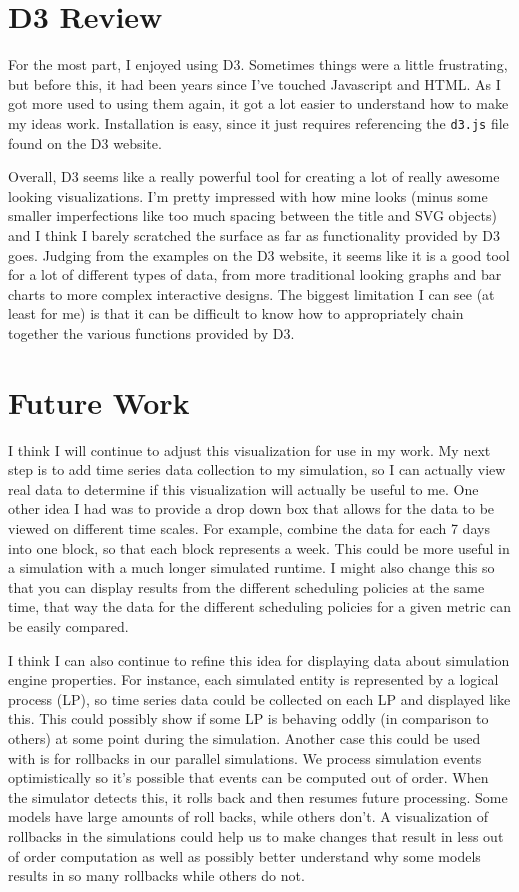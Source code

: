 \documentclass[11pt]{article}
\numberwithin{figure}{section}
\begin{document}
\section{D3 Review}
For the most part, I enjoyed using D3.  Sometimes things were a little frustrating, but before this, it had been years since I've touched Javascript and HTML.  As I got more used to using them again, it got a lot easier to understand how to make my ideas work.  Installation is easy, since it just requires referencing the \texttt{d3.js} file found on the D3 website.  

Overall, D3 seems like a really powerful tool for creating a lot of really awesome looking visualizations.  I'm pretty impressed with how mine looks (minus some smaller imperfections like too much spacing between the title and SVG objects) and I think I barely scratched the surface as far as functionality provided by D3 goes.  Judging from the examples on the D3 website, it seems like it is a good tool for a lot of different types of data, from more traditional looking graphs and bar charts to more complex interactive designs.  The biggest limitation I can see (at least for me) is that it can be difficult to know how to appropriately chain together the various functions provided by D3.

\section{Future Work}
I think I will continue to adjust this visualization for use in my work.  My next step is to add time series data collection to my simulation, so I can actually view real data to determine if this visualization will actually be useful to me.  One other idea I had was to provide a drop down box that allows for the data to be viewed on different time scales.  For example, combine the data for each 7 days into one block, so that each block represents a week.  This could be more useful in a simulation with a much longer simulated runtime. I might also change this so that you can display results from the different scheduling policies at the same time, that way the data for the different scheduling policies for a given metric can be easily compared.  

I think I can also continue to refine this idea for displaying data about simulation engine properties.  For instance, each simulated entity is represented by a logical process (LP), so time series data could be collected on each LP and displayed like this.  This could possibly show if some LP is behaving oddly (in comparison to others) at some point during the simulation.  Another case this could be used with is for rollbacks in our parallel simulations.  We process simulation events optimistically so it's possible that events can be computed out of order.  When the simulator detects this, it rolls back and then resumes future processing.  Some models have large amounts of roll backs, while others don't.  A visualization of rollbacks in the simulations could help us to make changes that result in less out of order computation as well as possibly better understand why some models results in so many rollbacks while others do not.  


%

%
\end{document}
